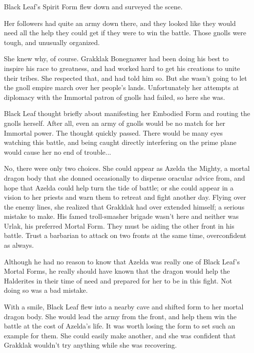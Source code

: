 \pagestyle{empty}

{\large\itshape

Black Leaf’s Spirit Form flew down and surveyed the scene.

Her followers had quite an army down there, and they looked like they would need all the help they could get if they were to win the battle. Those gnolls were tough, and unusually organized.

She knew why, of course. Grakklak Bonegnawer had been doing his best to inspire his race to greatness, and had worked hard to get his creations to unite their tribes. She respected that, and had told him so. But she wasn’t going to let the gnoll empire march over her people’s lands. Unfortunately her attempts at diplomacy with the Immortal patron of gnolls had failed, so here she was.

Black Leaf thought briefly about manifesting her Embodied Form and routing the gnolls herself. After all, even an army of gnolls would be no match for her Immortal power. The thought quickly passed. There would be many eyes watching this battle, and being caught directly interfering on the prime plane would cause her no end of trouble...

No, there were only two choices. She could appear as Azelda the Mighty, a mortal dragon body that she donned occasionally to dispense oracular advice from, and hope that Azelda could help turn the tide of battle; or she could appear in a vision to her priests and warn them to retreat and fight another day. Flying over the enemy lines, she realized that Grakklak had over extended himself; a serious mistake to make. His famed troll-smasher brigade wasn’t here and neither was Urlak, his preferred Mortal Form. They must be aiding the other front in his battle. Trust a barbarian to attack on two fronts at the same time, overconfident as always.

Although he had no reason to know that Azelda was really one of Black Leaf’s Mortal Forms, he really should have known that the dragon would help the Halderites in their time of need and prepared for her to be in this fight. Not doing so was a bad mistake.

With a smile, Black Leaf flew into a nearby cave and shifted form to her mortal dragon body. She would lead the army from the front, and help them win the battle at the cost of Azelda’s life. It was worth losing the form to set such an example for them. She could easily make another, and she was confident that Grakklak wouldn’t try anything while she was recovering.

}
